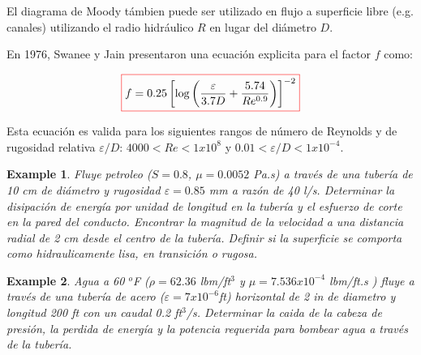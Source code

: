 \documentclass[11pt, oneside]{article}
\newtheorem{exa}{Example}
\begin{document}
El diagrama de Moody t\'ambien puede ser utilizado en flujo a superficie libre (e.g. canales) utilizando el radio hidr\'aulico $R$ en lugar del di\'ametro $D$. 

En 1976, Swanee y Jain presentaron una ecuaci\'on explicita para el factor $f$ como:

\begin{equation}
\color{red}\boxed{\color{black} f  = 0.25 \left[ \log \left( \frac{\varepsilon}{3.7D} + \frac{5.74}{Re^{0.9}} \right) \right]^{-2} }
\label{fric11}
\end{equation}

Esta ecuaci\'on es valida para los siguientes rangos de n\'umero de Reynolds y de rugosidad relativa $\varepsilon/D$: $4000<Re<1x10^8 $ y $0.01<\varepsilon/D <1x10^{-4}$.


\begin{shaded}
\begin{exa}
Fluye petroleo ($S=0.8$, $\mu = 0.0052$ Pa.s) a trav\'es de una tuber\'ia de 10 cm de di\'ametro y rugosidad $\varepsilon=0.85$ mm a raz\'on de 40 l/s. Determinar la disipaci\'on de energ\'ia por unidad de longitud en la tuber\'ia y el esfuerzo de corte en la pared del conducto. Encontrar la magnitud de la velocidad a una distancia radial de 2 cm desde el centro de la tuber\'ia. Definir si la superficie se comporta como hidraulicamente lisa, en transici\'on o rugosa.
\end{exa}
\end{shaded}

\begin{shaded}
\begin{exa}
Agua a 60 $^o$F ($\rho=62.36$ lbm/ft$^3$ y $\mu = 7.536 x10^{-4}$ lbm/ft.s ) fluye a trav\'es de una tuber\'ia de acero ($\varepsilon= 7x10^{-6}$ft) horizontal de 2 in de diametro y longitud 200 ft con un caudal 0.2 ft$^3$/s. Determinar la caida de la cabeza de presi\'on, la perdida de energ\'ia y la potencia requerida para bombear agua a trav\'es de la tuber\'ia. 
\end{exa}
\end{shaded}



%
%
\end{document}
